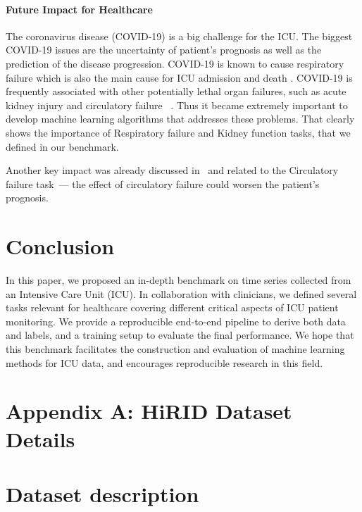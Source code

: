 \documentclass{article}
\begin{document}
\paragraph{Future Impact for Healthcare}
The coronavirus disease (COVID-19) is a big challenge for the ICU. The biggest COVID-19 issues are the uncertainty of patient's prognosis as well as the prediction of the disease progression. COVID-19 is known to cause respiratory failure \cite{li2020neuroinvasive} which is also the main cause for ICU admission and death \cite{li2020acute, ruan2020clinical, richardson2020presenting, holter2020systemic}. COVID-19 is frequently associated with other potentially lethal organ failures, such as acute kidney injury and circulatory failure ~\cite{cheng2020kidney, henry2020chronic}. Thus it became extremely important to develop machine learning algorithms that addresses these problems.  That clearly shows the importance of Respiratory failure and Kidney function tasks, that we defined in our benchmark. 

Another key impact was already discussed in~\cite{hyland2020early} and related to the Circulatory failure task~--- the effect of circulatory failure could worsen the patient's prognosis.

\fi


 \section{Conclusion}
In this paper, we proposed an in-depth benchmark on time series collected from an Intensive Care Unit (ICU). In collaboration with clinicians, we defined several tasks relevant for healthcare covering different critical aspects of ICU patient monitoring. We provide a reproducible end-to-end pipeline to derive both data and labels, and a training setup to evaluate the final performance. 
We hope that this benchmark facilitates the construction and evaluation of machine learning methods for ICU data, and encourages reproducible research in this field.






\appendix

\section{Appendix A: HiRID Dataset Details}



\section*{Dataset description}
\end{document}
